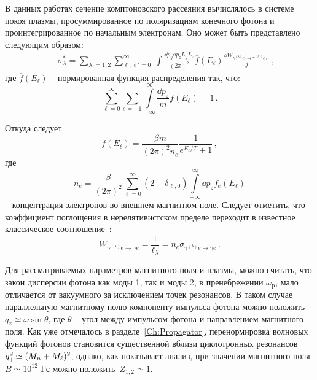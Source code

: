 В данных работах сечение комптоновского рассеяния вычислялось в системе покоя плазмы, просуммированное по поляризациям конечного фотона и проинтегрированное по начальным электронам. Оно может быть представлено следующим образом:
\begin{eqnarray}
\label{eq:sigma}
&&\sigma^*_\lambda = 
\sum\limits_{\lambda'=1, 2} 
\sum\limits_{\ell, \ell' = 0}^{\infty} \; \int  \frac{\dd p_y \dd p_z L_y L_z}{(2\pi)^2} \overline{f}(E_\ell) 
\frac{\dd W_{\gamma^{(\lambda)} e_\ell \to \gamma^{(\lambda')} e_{\ell'}}}{j}\, ,
\end{eqnarray}
где $\overline{f}(E_\ell)$ -- нормированная функция распределения так, что:
\begin{equation}
\sum\limits_{\ell = 0}^{\infty}
\sum\limits_{s=\pm 1} 
\int \limits_{-\infty}^{\infty} \frac{\dd p_z}{m} \overline{f}(E_\ell)=1\, .
\end{equation}

Откуда следует:
\begin{equation}
	\overline{f}(E_\ell)=\frac{\beta m}{(2\pi)^2n_e}\frac{1}{e^{E_\ell/T}+1}\, ,
\end{equation}
где 
\begin{equation}\label{eq:ne}
	n_e = \frac{\beta}{(2 \pi)^2} \sum \limits^{\infty}_{\ell=0} 
	(2-\delta_{\ell,0}) \int \limits^{\infty}_{-\infty}\dd p_z f_{e}(E_{\ell})
\end{equation}
-- концентрация электронов во внешнем магнитном поле. Следует отметить, что коэффициент поглощения в 
нерелятивистском пределе переходит в известное классическое соотношение~\cite{Landau:1989}:
\begin{equation}
	W_{\gamma^{(\lambda)} e\to\gamma e}=\frac{1}{\ell_\lambda}=n_e 
	\sigma_{\gamma^{(\lambda)} e\to\gamma e}\, .
\end{equation}

Для рассматриваемых параметров магнитного поля и плазмы, можно считать, что закон дисперсии фотона как моды 1, так и моды 2, в пренебрежении $\omega_{\text{p}}$, мало отличается от вакуумного за исключением точек резонансов. В таком случае параллельную магнитному полю компоненту импульса фотона можно положить
$q_z \simeq \omega \sin{\theta}$, где 
$\theta$ -- угол между импульсом фотона и направлением магнитного поля. Как уже отмечалось в разделе~\ref{Ch:Propagator}, перенормировка волновых функций фотонов становится существенной вблизи циклотронных резонансов $q^2_{\mbox{\tiny $\|$}} \simeq (M_n+M_{\ell})^2$, однако, как показывает анализ, при значении магнитного поля $B\simeq 10^{12}$ Гс можно положить~$Z_{1,2}\simeq 1$.

